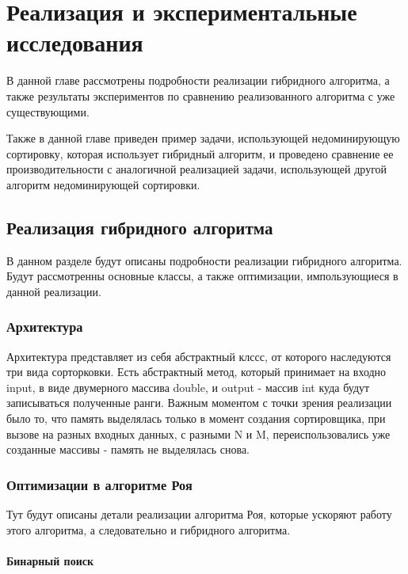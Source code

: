 \chapter{Реализация и экспериментальные исследования}
\label{chapter3}

В данной главе рассмотрены подробности реализации гибридного алгоритма, а также результаты экспериментов по сравнению
реализованного алгоритма с уже существующими.

Также в данной главе приведен пример задачи, использующей недоминирующую сортировку, которая использует гибридный
алгоритм, и проведено сравнение ее производительности с аналогичной реализацией задачи, использующей другой алгоритм
недоминирующей сортировки.

\section{Реализация гибридного алгоритма}

В данном разделе будут описаны подробности реализации гибридного алгоритма. Будут рассмотренны основные классы, а также
оптимизации, импользующиеся в данной реализации.

\subsection{Архитектура}

Архитектура представляет из себя абстрактный клссс, от которого наследуются три вида сорторковки. Есть абстрактный
метод, который принимает на входно input, в виде двумерного массива double, и output - массив int куда будут
записываться полученные ранги.
Важным моментом с точки зрения реализации было то, что память выделялась только в момент создания сортировщика, при
вызове на разных входных данных, с разными N и M, переиспользовались уже созданные массивы - память не выделялась снова.

\subsection{Оптимизации в алгоритме Роя}

Тут будут описаны детали реализации алгоритма Роя, которые ускоряют работу этого алгоритма, а следовательно и гибридного
алгоритма.

\subsubsection{Бинарный поиск}

